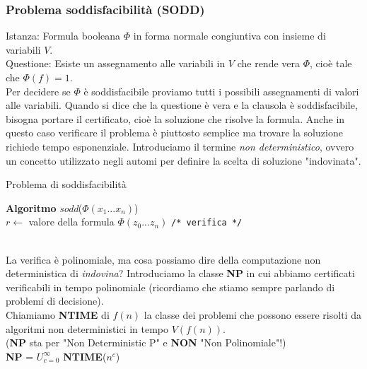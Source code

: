 \subsubsection{Problema soddisfacibilità (SODD)}
Istanza: Formula booleana $\Phi$ in forma normale congiuntiva con insieme di variabili $V$.\\
Questione: Esiste un assegnamento alle variabili in $V$ che rende vera $\Phi$, cioè tale che $\Phi(f) = 1$.\\
Per decidere se $\Phi$ è soddisfacibile proviamo tutti i possibili assegnamenti di valori alle variabili.
Quando si dice che la questione è vera e la clausola è soddisfacibile, bisogna portare il 
certificato, cioè la soluzione che risolve la formula.
Anche in questo caso verificare il problema è piuttosto semplice ma trovare la soluzione 
richiede tempo esponenziale.
Introduciamo il termine \emph{non deterministico}, ovvero un concetto utilizzato 
negli automi per definire la scelta di soluzione "indovinata".\\
\begin{algorithm}
    \caption{Problema di soddisfacibilità}
    \Indm\textbf{Algoritmo} \emph{sodd}($\Phi(x_1...x_n)$)\\
    \Indp{}
    $r \leftarrow$ valore della formula $\Phi(z_0...z_n)$ \texttt{/* verifica */}\\
\end{algorithm}\\
La verifica è polinomiale, ma cosa possiamo dire della computazione non deterministica di \emph{indovina}? 
Introduciamo la classe \textbf{NP} in cui abbiamo certificati verificabili 
in tempo polinomiale (ricordiamo che stiamo sempre parlando di problemi di decisione).\\
Chiamiamo \textbf{NTIME} di $f(n)$ la classe dei problemi che possono essere 
risolti da algoritmi non deterministici in tempo $V(f(n))$.\\
(\textbf{NP} sta per "Non Deterministic P" e \textbf{NON} "Non Polinomiale"!)\\
\textbf{NP} = $U^{\infty}_{c = 0}$ \textbf{NTIME}($n^c$)\\

